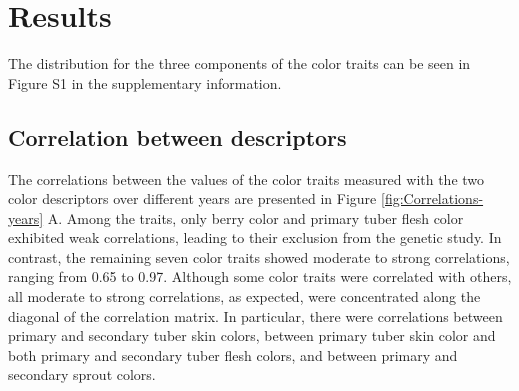 \documentclass[pdflatex,sn-mathphys-ay]{sn-jnl}%
\begin{document}
\section{Results}


The distribution for the three components of the color traits can be seen in Figure S1 in the supplementary information.


\subsection{Correlation between descriptors}

The correlations between the values of the color traits measured with the two color descriptors over different years are presented in Figure \ref{fig:Correlations-years} A. Among the traits, only berry color and primary tuber flesh color exhibited weak correlations, leading to their exclusion from the genetic study. In contrast, the remaining seven color traits showed moderate to strong correlations, ranging from 0.65 to 0.97. Although some color traits were correlated with others, all moderate to strong correlations, as expected, were concentrated along the diagonal of the correlation matrix. In particular, there were correlations between primary and secondary tuber skin colors, between primary tuber skin color and both primary and secondary tuber flesh colors, and between primary and secondary sprout colors.




\end{document}
